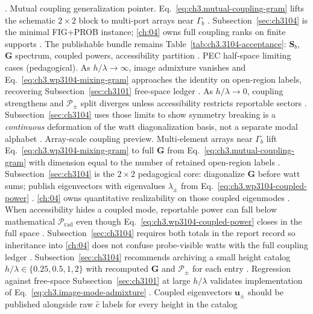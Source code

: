 \cite{jackson1999}.
Mutual coupling generalization pointer. Eq.~\eqref{eq:ch3.mutual-coupling-gram} lifts the schematic \(2\times2\) block to multi-port arrays near \(\Gamma_{b}\)
\cite{harrington2001}. Subsection~\ref{sec:ch3104} is the minimal FIG+PROB instance; \ref{ch:04} owns full coupling ranks on finite supports
\cite{devaney2004}. The publishable bundle remains Table~\ref{tab:ch3.3104-acceptance}: \(\mathbf{S}_{b}\), \(\mathbf{G}\) spectrum, coupled powers, accessibility partition
\cite{stratton1941}.
PEC half-space limiting cases (pedagogical). As \(h/\lambda\to\infty\), image admixture vanishes and Eq.~\eqref{eq:ch3.wp3104-mixing-gram} approaches the identity on open-region labels, recovering Subsection~\ref{sec:ch3101} free-space ledger
\cite{jackson1999}. As \(h/\lambda\to0\), coupling strengthens and \(\mathcal{P}_{\pm}\) split diverges unless accessibility restricts reportable sectors
\cite{harrington2001}. Subsection~\ref{sec:ch3104} uses those limits to show symmetry breaking is a \emph{continuous} deformation of the watt diagonalization basis, not a separate modal alphabet
\cite{kato1995}.
Array-scale coupling preview. Multi-element arrays near \(\Gamma_{b}\) lift Eq.~\eqref{eq:ch3.wp3104-mixing-gram} to full \(\mathbf{G}\) from Eq.~\eqref{eq:ch3.mutual-coupling-gram} with dimension equal to the number of retained open-region labels
\cite{harrington2001}. Subsection~\ref{sec:ch3104} is the \(2\times2\) pedagogical core: diagonalize \(\mathbf{G}\) before watt sums; publish eigenvectors with eigenvalues \(\lambda_{\pm}\) from Eq.~\eqref{eq:ch3.wp3104-coupled-power}
\cite{kato1995}. \ref{ch:04} owns quantitative realizability on those coupled eigenmodes \cite{devaney2004}.
When accessibility hides a coupled mode, reportable power can fall below mathematical \(\mathcal{P}_{\mathrm{rad}}\) even though Eq.~\eqref{eq:ch3.wp3104-coupled-power} closes in the full space
\cite{harrington2001}. Subsection~\ref{sec:ch3104} requires both totals in the report record so inheritance into \ref{ch:04} does not confuse probe-visible watts with the full coupling ledger
\cite{hansen1988}.
Subsection~\ref{sec:ch3104} recommends archiving a small height catalog \(h/\lambda\in\{0.25,0.5,1,2\}\) with recomputed \(\mathbf{G}\) and \(\mathcal{P}_{\pm}\) for each entry
\cite{jackson1999}. Regression against free-space Subsection~\ref{sec:ch3101} at large \(h/\lambda\) validates implementation of Eq.~\eqref{eq:ch3.image-mode-admixture}
\cite{hansen1988}. Coupled eigenvectors \(\mathbf{u}_{\pm}\) should be published alongside raw \(\widehat{c}\) labels for every height in the catalog
